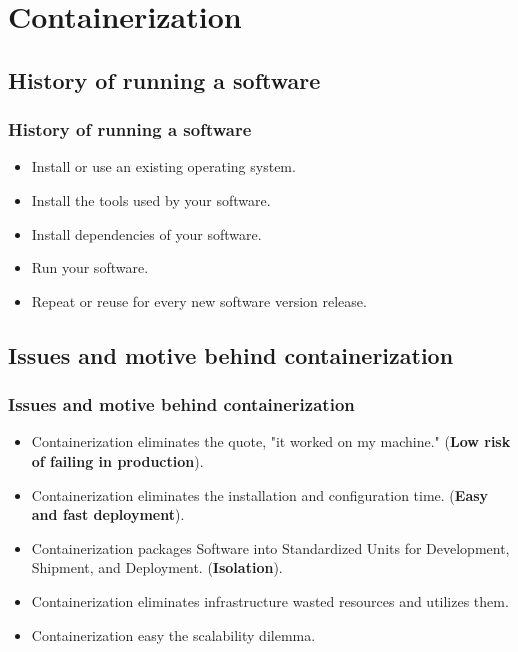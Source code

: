 
\section{Containerization}

\subsection{History of running a software}
\begin{frame}
	\frametitle{History of running a software}
	\begin{itemize}
		\item Install or use an existing operating system.
		\item Install the tools used by your software.
		\item Install dependencies of your software.
		\item Run your software.
		\item Repeat or reuse for every new software version release.
	\end{itemize}
\end{frame}

\subsection{Issues and motive behind containerization}
\begin{frame}
	\frametitle{Issues and motive behind containerization}
	\begin{itemize}
		\item Containerization eliminates the quote, "it worked on my machine." (\textbf{Low risk of failing in production}).
		\item Containerization eliminates the installation and configuration time. (\textbf{Easy and fast deployment}).
		\item Containerization packages Software into Standardized Units for Development, Shipment, and Deployment. (\textbf{Isolation}).
		\item Containerization eliminates infrastructure wasted resources and utilizes them.
		\item Containerization easy the scalability dilemma.
	\end{itemize}
\end{frame}

